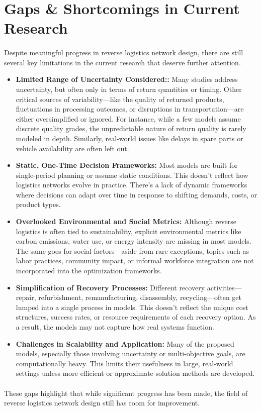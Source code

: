 \section{Gaps \& Shortcomings in Current Research}

\paragraph{} Despite meaningful progress in reverse logistics network design, there are still several key limitations in the current research that deserve further attention.

\begin{itemize}[label=,leftmargin=2mm]
    \item \textbf{Limited Range of Uncertainty Considered::}
        Many studies address uncertainty, but often only in terms of return quantities or timing. Other critical sources of variability—like the quality of returned products, fluctuations in processing outcomes, or disruptions in transportation—are either oversimplified or ignored. For instance, while a few models assume discrete quality grades, the unpredictable nature of return quality is rarely modeled in depth. Similarly, real-world issues like delays in spare parts or vehicle availability are often left out.

    \item \textbf{Static, One-Time Decision Frameworks:}
        Most models are built for single-period planning or assume static conditions. This doesn’t reflect how logistics networks evolve in practice. There’s a lack of dynamic frameworks where decisions can adapt over time in response to shifting demands, costs, or product types.

    \item \textbf{Overlooked Environmental and Social Metrics:}
        Although reverse logistics is often tied to sustainability, explicit environmental metrics like carbon emissions, water use, or energy intensity are missing in most models. The same goes for social factors—aside from rare exceptions, topics such as labor practices, community impact, or informal workforce integration are not incorporated into the optimization frameworks.

    \item \textbf{Simplification of Recovery Processes:}
        Different recovery activities—repair, refurbishment, remanufacturing, disassembly, recycling—often get lumped into a single process in models. This doesn’t reflect the unique cost structures, success rates, or resource requirements of each recovery option. As a result, the models may not capture how real systems function.

    \item \textbf{Challenges in Scalability and Application:}
        Many of the proposed models, especially those involving uncertainty or multi-objective goals, are computationally heavy. This limits their usefulness in large, real-world settings unless more efficient or approximate solution methods are developed.
\end{itemize}
\paragraph{} These gaps highlight that while significant progress has been made, the field of reverse logistics network design still has room for improvement.